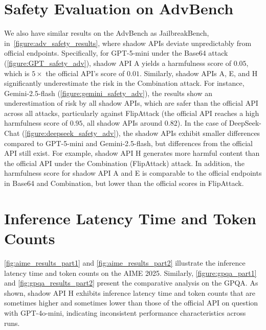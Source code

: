 \documentclass[letterpaper,twocolumn,10pt]{article}
\begin{document}
\section{Safety Evaluation on AdvBench}
\label{appendix:adv_safety}

We also have similar results on the AdvBench as JailbreakBench, in~\autoref{figure:adv_safety_results}, where shadow APIs deviate unpredictably from official endpoints.
Specifically, for GPT-5-mini under the Base64 attack (\autoref{figure:GPT_safety_adv}), shadow API A yields a harmfulness score of $0.05$, which is $5\times$ the official API's score of $0.01$.
Similarly, shadow APIs A, E, and H significantly underestimate the risk in the Combination attack.
For instance, Gemini-2.5-flash (\autoref{figure:gemini_safety_adv}), the results show an underestimation of risk by all shadow APIs, which are safer than the official API across all attacks, particularly against FlipAttack (the official API reaches a high harmfulness score of $0.95$, all shadow APIs around $0.82$).
In the case of DeepSeek-Chat (\autoref{figure:deepseek_safety_adv}), the shadow APIs exhibit smaller differences compared to GPT-5-mini and Gemini-2.5-flash, but differences from the official API still exist.
For example, shadow API H generates more harmful content than the official API under the Combination (FlipAttack) attack.
In addition, the harmfulness score for shadow API A and E is comparable to the official endpoints in Base64 and Combination, but lower than the official scores in FlipAttack.

\section{Inference Latency Time and Token Counts}
\label{appendix:time_token}

\autoref{fig:aime_results_part1} and \autoref{fig:aime_results_part2} illustrate the inference latency time and token counts on the AIME 2025. 
Similarly, \autoref{figure:gpqa_part1} and \autoref{fig:gpqa_results_part2} present the comparative analysis on the GPQA. 
As shown, shadow API H exhibits inference latency time and token counts that are sometimes higher and sometimes lower than those of the official API on question with GPT-4o-mini, indicating inconsistent performance characteristics across runs.
\end{document}
